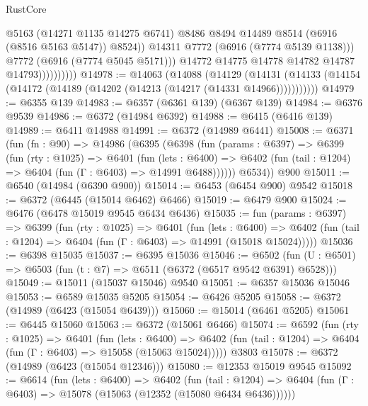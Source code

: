 \begin{lexlean}{RustCore}
\begin{coremodule}
                                @5163
                                (@14271 @1135 @14275 @6741)
                                @8486
                                @8494
                                @14489
                                @8514
                                (@6916 (@8516 @5163 @5147))
                                @8524))
                            @14311
                            @7772
                            (@6916 (@7774 @5139 @1138)))
                          @7772
                          (@6916 (@7774 @5045 @5171)))
                        @14772
                        @14775
                        @14778
                        @14782
                        @14787
                        @14793))))))))))
@14978 := @14063
    (@14088
      (@14129
        (@14131 (@14133 (@14154 (@14172 (@14189 (@14202 (@14213 (@14217 (@14331 @14966)))))))))))
@14979 := @6355 @139
@14983 := @6357 (@6361 @139) (@6367 @139)
@14984 := @6376 @9539
@14986 := @6372 (@14984 @6392)
@14988 := @6415 (@6416 @139)
@14989 := @6411 @14988
@14991 := @6372 (@14989 @6441)
@15008 := @6371
    (fun (fn : @90) =>
    @14986
      (@6395
        (@6398
          (fun (params : @6397) =>
          @6399
            (fun (rty : @1025) =>
            @6401
              (fun (lets : @6400) =>
              @6402 (fun (tail : @1204) => @6404 (fun (Γ : @6403) => @14991 @6488))))))
        @6534))
    @900
@15011 := @6540 (@14984 (@6390 @900))
@15014 := @6453 (@6454 @900) @9542
@15018 := @6372 (@6445 (@15014 @6462) @6466)
@15019 := @6479 @900
@15024 := @6476 (@6478 @15019 @9545 @6434 @6436)
@15035 := fun (params : @6397) =>
  @6399
    (fun (rty : @1025) =>
    @6401
      (fun (lets : @6400) =>
      @6402 (fun (tail : @1204) => @6404 (fun (Γ : @6403) => @14991 (@15018 @15024)))))
@15036 := @6398 @15035
@15037 := @6395 @15036
@15046 := @6502 (fun (U : @6501) => @6503 (fun (t : @7) => @6511 (@6372 (@6517 @9542 @6391) @6528)))
@15049 := @15011 (@15037 @15046) @9540
@15051 := @6357 @15036 @15046
@15053 := @6589 @15035 @5205
@15054 := @6426 @5205
@15058 := @6372 (@14989 (@6423 (@15054 @6439)))
@15060 := @15014 (@6461 @5205)
@15061 := @6445 @15060
@15063 := @6372 (@15061 @6466)
@15074 := @6592
    (fun (rty : @1025) =>
    @6401
      (fun (lets : @6400) =>
      @6402 (fun (tail : @1204) => @6404 (fun (Γ : @6403) => @15058 (@15063 @15024)))))
    @3803
@15078 := @6372 (@14989 (@6423 (@15054 @12346)))
@15080 := @12353 @15019 @9545
@15092 := @6614
    (fun (lets : @6400) =>
    @6402
      (fun (tail : @1204) =>
      @6404 (fun (Γ : @6403) => @15078 (@15063 (@12352 (@15080 @6434 @6436))))))

\end{coremodule}
\end{lexlean}
